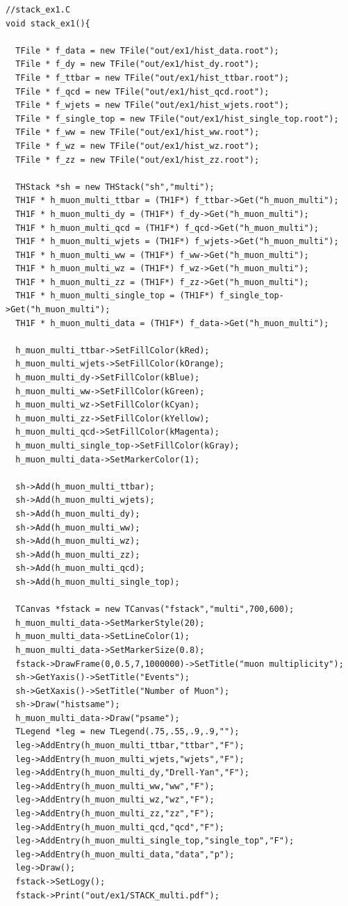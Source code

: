 \documentclass[11pt]{article}
\begin{document}
\begin{lstlisting}[emph={if,while,continue,new},emphstyle=\color{nut}]
//stack_ex1.C
void stack_ex1(){

  TFile * f_data = new TFile("out/ex1/hist_data.root");
  TFile * f_dy = new TFile("out/ex1/hist_dy.root");
  TFile * f_ttbar = new TFile("out/ex1/hist_ttbar.root");
  TFile * f_qcd = new TFile("out/ex1/hist_qcd.root");
  TFile * f_wjets = new TFile("out/ex1/hist_wjets.root");
  TFile * f_single_top = new TFile("out/ex1/hist_single_top.root");
  TFile * f_ww = new TFile("out/ex1/hist_ww.root");
  TFile * f_wz = new TFile("out/ex1/hist_wz.root");
  TFile * f_zz = new TFile("out/ex1/hist_zz.root");

  THStack *sh = new THStack("sh","multi");
  TH1F * h_muon_multi_ttbar = (TH1F*) f_ttbar->Get("h_muon_multi");
  TH1F * h_muon_multi_dy = (TH1F*) f_dy->Get("h_muon_multi");
  TH1F * h_muon_multi_qcd = (TH1F*) f_qcd->Get("h_muon_multi");
  TH1F * h_muon_multi_wjets = (TH1F*) f_wjets->Get("h_muon_multi");
  TH1F * h_muon_multi_ww = (TH1F*) f_ww->Get("h_muon_multi");
  TH1F * h_muon_multi_wz = (TH1F*) f_wz->Get("h_muon_multi");
  TH1F * h_muon_multi_zz = (TH1F*) f_zz->Get("h_muon_multi");
  TH1F * h_muon_multi_single_top = (TH1F*) f_single_top->Get("h_muon_multi");
  TH1F * h_muon_multi_data = (TH1F*) f_data->Get("h_muon_multi");

  h_muon_multi_ttbar->SetFillColor(kRed);
  h_muon_multi_wjets->SetFillColor(kOrange);
  h_muon_multi_dy->SetFillColor(kBlue);
  h_muon_multi_ww->SetFillColor(kGreen);
  h_muon_multi_wz->SetFillColor(kCyan);
  h_muon_multi_zz->SetFillColor(kYellow);
  h_muon_multi_qcd->SetFillColor(kMagenta);
  h_muon_multi_single_top->SetFillColor(kGray);
  h_muon_multi_data->SetMarkerColor(1);

  sh->Add(h_muon_multi_ttbar);
  sh->Add(h_muon_multi_wjets);
  sh->Add(h_muon_multi_dy);
  sh->Add(h_muon_multi_ww);
  sh->Add(h_muon_multi_wz);
  sh->Add(h_muon_multi_zz);
  sh->Add(h_muon_multi_qcd);
  sh->Add(h_muon_multi_single_top);

  TCanvas *fstack = new TCanvas("fstack","multi",700,600);
  h_muon_multi_data->SetMarkerStyle(20);
  h_muon_multi_data->SetLineColor(1);
  h_muon_multi_data->SetMarkerSize(0.8);
  fstack->DrawFrame(0,0.5,7,1000000)->SetTitle("muon multiplicity");
  sh->GetYaxis()->SetTitle("Events");
  sh->GetXaxis()->SetTitle("Number of Muon");
  sh->Draw("histsame");
  h_muon_multi_data->Draw("psame");
  TLegend *leg = new TLegend(.75,.55,.9,.9,"");
  leg->AddEntry(h_muon_multi_ttbar,"ttbar","F");
  leg->AddEntry(h_muon_multi_wjets,"wjets","F");
  leg->AddEntry(h_muon_multi_dy,"Drell-Yan","F");
  leg->AddEntry(h_muon_multi_ww,"ww","F");
  leg->AddEntry(h_muon_multi_wz,"wz","F");
  leg->AddEntry(h_muon_multi_zz,"zz","F");
  leg->AddEntry(h_muon_multi_qcd,"qcd","F");
  leg->AddEntry(h_muon_multi_single_top,"single_top","F");
  leg->AddEntry(h_muon_multi_data,"data","p");
  leg->Draw();
  fstack->SetLogy();
  fstack->Print("out/ex1/STACK_multi.pdf");


\end{lstlisting}
\end{document}
